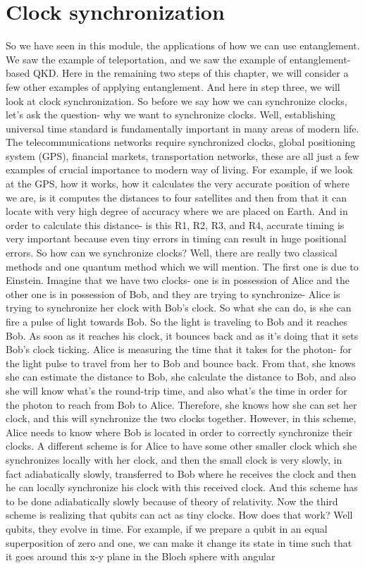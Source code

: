 \section{Clock synchronization}
\label{sec:14-3_clock_sync}

So we have seen in this module, the applications of how we can use entanglement. We saw the example of teleportation, and we saw the example of entanglement-based QKD. Here in the remaining two steps of this chapter, we will consider a few other examples of applying entanglement. And here in step three, we will look at clock synchronization. So before we say how we can synchronize clocks, let's ask the question- why we want to synchronize clocks. Well, establishing universal time standard is fundamentally important in many areas of modern life. The telecommunications networks require synchronized clocks, global positioning system (GPS), financial markets, transportation networks, these are all just a few examples of crucial importance to modern way of living. For example, if we look at the GPS, how it works, how it calculates the very accurate position of where we are, is it computes the distances to four satellites and then from that it can locate with very high degree of accuracy where we are placed on Earth. And in order to calculate this distance- is this R1, R2, R3, and R4, accurate timing is very important because even tiny errors in timing can result in huge positional errors. So how can we synchronize clocks? Well, there are really two classical methods and one quantum method which we will mention. The first one is due to Einstein. Imagine that we have two clocks- one is in possession of Alice and the other one is in possession of Bob, and they are trying to synchronize- Alice is trying to synchronize her clock with Bob's clock. So what she can do, is she can fire a pulse of light towards Bob. So the light is traveling to Bob and it reaches Bob. As soon as it reaches his clock, it bounces back and as it's doing that it sets Bob's clock ticking. Alice is measuring the time that it takes for the photon- for the light pulse to travel from her to Bob and bounce back. From that, she knows she can estimate the distance to Bob, she calculate the distance to Bob, and also she will know what's the round-trip time, and also what's the time in order for the photon to reach from Bob to Alice. Therefore, she knows how she can set her clock, and this will synchronize the two clocks together. However, in this scheme, Alice needs to know where Bob is located in order to correctly synchronize their clocks. A different scheme is for Alice to have some other smaller clock which she synchronizes locally with her clock, and then the small clock is very slowly, in fact adiabatically slowly, transferred to Bob where he receives the clock and then he can locally synchronize his clock with this received clock. And this scheme has to be done adiabatically slowly because of theory of relativity. Now the third scheme is realizing that qubits can act as tiny clocks. How does that work? Well qubits, they evolve in time. For example, if we prepare a qubit in an equal superposition of zero and one, we can make it change its state in time such that it goes around this x-y plane in the Bloch sphere with angular 
